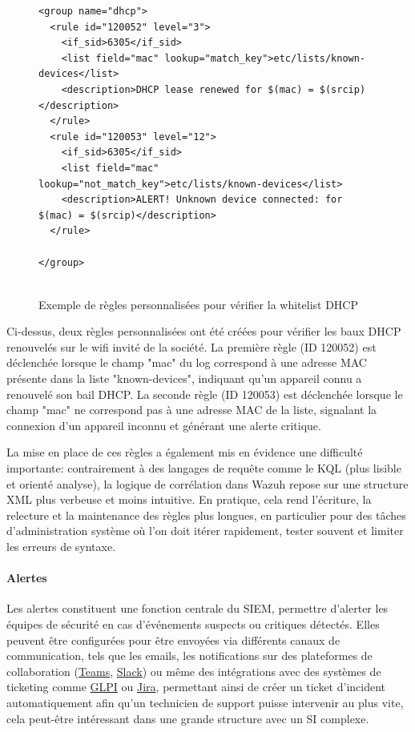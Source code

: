 \documentclass[a4paper, 11pt]{article}
\begin{document}
\begin{figure}[H]
  \centering
  \begin{minipage}{1\textwidth}
\begin{lstlisting}[language=WazuhXML]
<group name="dhcp">
  <rule id="120052" level="3">
    <if_sid>6305</if_sid>
    <list field="mac" lookup="match_key">etc/lists/known-devices</list>
    <description>DHCP lease renewed for $(mac) = $(srcip)</description>
  </rule>
  <rule id="120053" level="12">
    <if_sid>6305</if_sid>
    <list field="mac" lookup="not_match_key">etc/lists/known-devices</list>
    <description>ALERT! Unknown device connected: for $(mac) = $(srcip)</description>
  </rule>

</group>


\end{lstlisting}

  \caption{Exemple de règles personnalisées pour vérifier la whitelist DHCP}
  \label{fig9}
  \end{minipage}
\end{figure}


Ci-dessus, deux règles personnalisées ont été créées pour vérifier les baux DHCP renouvelés sur le wifi invité de la société. La première règle (ID 120052) 
est déclenchée lorsque le champ "mac" du log correspond à une adresse MAC présente dans la liste "known-devices", indiquant 
qu'un appareil connu a renouvelé son bail DHCP. La seconde règle (ID 120053) est déclenchée lorsque le champ "mac" ne correspond
 pas à une adresse MAC de la liste, signalant la connexion d'un appareil inconnu et générant une alerte critique.
 \par\bigskip

La mise en place de ces règles a également mis en évidence une difficulté importante: contrairement à des langages de requête 
comme le KQL (plus lisible et orienté analyse), la logique de corrélation dans Wazuh repose sur une structure XML plus verbeuse et moins intuitive. En pratique,
 cela rend l'écriture, la relecture et la maintenance des règles plus longues, en particulier pour des tâches d'administration système où l'on doit itérer rapidement,
  tester souvent et limiter les erreurs de syntaxe.

 \newpage
\paragraph{Alertes}
Les alertes constituent une fonction centrale du SIEM, permettre d'alerter les équipes de sécurité en cas d'événements suspects
 ou critiques détectés. Elles peuvent être configurées pour être envoyées via différents canaux de communication,
  tels que les emails, les notifications sur des plateformes de collaboration (\href{https://www.microsoft.com/fr-fr/microsoft-teams/group-chat-software}{Teams}, \href{https://slack.com}{Slack})
   ou même des intégrations avec des systèmes de ticketing comme \href{https://www.glpi-project.org/}{GLPI} ou \href{https://www.atlassian.com/software/jira}{Jira}, permettant ainsi de créer un ticket d'incident automatiquement afin qu'un technicien de
    support puisse intervenir au plus vite, cela peut-être intéressant dans une grande structure avec un SI complexe.
\end{document}
